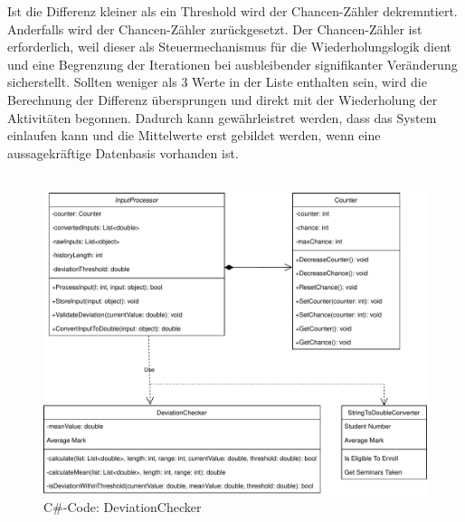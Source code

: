     Ist die Differenz kleiner als ein Threshold wird der Chancen-Zähler dekremntiert. 
    Anderfalls wird der Chancen-Zähler zurückgesetzt.
    Der Chancen-Zähler ist erforderlich, weil dieser als Steuermechanismus für die Wiederholungslogik dient und eine Begrenzung der Iterationen bei ausbleibender signifikanter Veränderung sicherstellt.
    Sollten weniger als 3 Werte in der Liste enthalten sein, wird die Berechnung der Differenz übersprungen und direkt mit der Wiederholung der Aktivitäten begonnen.
    Dadurch kann gewährleistret werden, dass das System einlaufen kann und die Mittelwerte erst gebildet werden, wenn eine aussagekräftige Datenbasis vorhanden ist.\\
    \\
    \begin{figure}[H]
        \centering
        \includegraphics[width=\textwidth]{./images/klassendiagramm-blockb.pdf}        
        \caption{C\#-Code: DeviationChecker}
    \end{figure}
